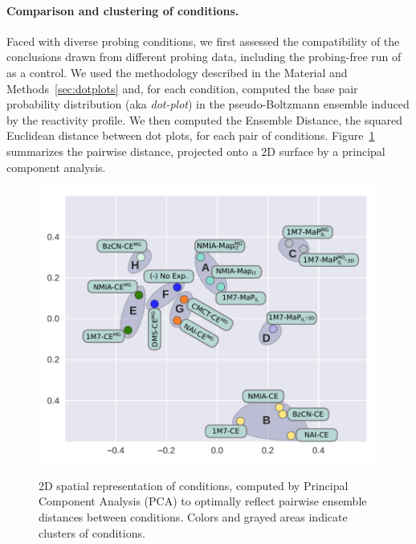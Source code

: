 \documentclass[a4,center,fleqn]{NAR}
\begin{document}
\paragraph{Comparison and clustering of conditions.}
Faced with diverse probing conditions, we first assessed the compatibility of the conclusions drawn from different probing data, including the probing-free run of \OurTool as a control. We used the methodology described in the Material and Methods~\ref{sec:dotplots} and, for each condition, computed the base pair probability distribution (aka \emph{dot-plot}) in the  pseudo-Boltzmann ensemble induced by the reactivity profile. We then computed the Ensemble Distance, the squared Euclidean distance between dot plots, for each pair of conditions. Figure~\ref{fig:PCA} summarizes the pairwise distance, projected onto a 2D surface by a principal component analysis. 


\begin{figure}
	{\centering \includegraphics[width=\linewidth]{graphs/didy/PCA}\\}%
	
	\caption{2D spatial representation of conditions, computed by Principal Component Analysis (PCA) to optimally reflect pairwise ensemble distances between conditions. Colors and grayed areas indicate clusters of conditions.}\label{fig:PCA}
\end{figure}
\end{document}
